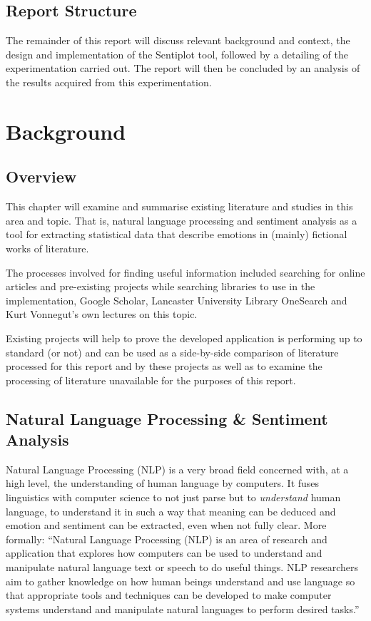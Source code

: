 \documentclass{article}
\begin{document}
{    \subsection{Report Structure}
        The remainder of this report will discuss relevant background and context, the design and implementation of the Sentiplot tool, followed by a detailing of the experimentation carried out. The report will then be concluded by an analysis of the results acquired from this experimentation. \citep{reagan2016emotional}
\newpage
\section{Background}
\label{sec:background)}
    \subsection{Overview}
        This chapter will examine and summarise existing literature and studies in this area and topic. That is, natural language processing and sentiment analysis as a tool for extracting statistical data that describe emotions in (mainly) fictional works of literature.

        The processes involved for finding useful information included searching for online articles and pre-existing projects while searching libraries to use in the implementation, Google Scholar, Lancaster University Library OneSearch and Kurt Vonnegut’s own lectures on this topic.

        Existing projects will help to prove the developed application is performing up to standard (or not) and can be used as a side-by-side comparison of literature processed for this report and by these projects as well as to examine the processing of literature unavailable for the purposes of this report.
    \subsection{Natural Language Processing \& Sentiment Analysis}
        Natural Language Processing (NLP) is a very broad field concerned with, at a high level, the understanding of human language by computers. It fuses linguistics with computer science to not just parse but to \textit{understand} human language, to understand it in such a way that meaning can be deduced and emotion and sentiment can be extracted, even when not fully clear. More formally: ``Natural Language Processing (NLP) is an area of research and application that explores how computers can be used to understand and manipulate natural language text or speech to do useful things. NLP researchers aim to gather knowledge on how human beings understand and use language so that appropriate tools and techniques can be developed to make computer systems understand and manipulate natural languages to perform desired tasks.'' \citep{chowdhury2003natural}

}
\end{document}
